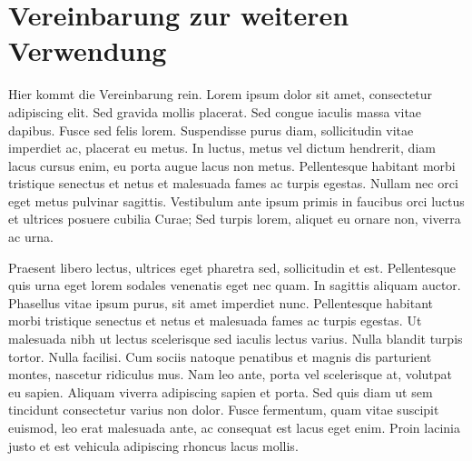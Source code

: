 \chapter*{Vereinbarung zur weiteren Verwendung}

Hier kommt die Vereinbarung rein. Lorem ipsum dolor sit amet, consectetur adipiscing elit. Sed gravida mollis placerat. Sed congue iaculis massa vitae dapibus. Fusce sed felis lorem. Suspendisse purus diam, sollicitudin vitae imperdiet ac, placerat eu metus. In luctus, metus vel dictum hendrerit, diam lacus cursus enim, eu porta augue lacus non metus. Pellentesque habitant morbi tristique senectus et netus et malesuada fames ac turpis egestas. Nullam nec orci eget metus pulvinar sagittis. Vestibulum ante ipsum primis in faucibus orci luctus et ultrices posuere cubilia Curae; Sed turpis lorem, aliquet eu ornare non, viverra ac urna.

Praesent libero lectus, ultrices eget pharetra sed, sollicitudin et est. Pellentesque quis urna eget lorem sodales venenatis eget nec quam. In sagittis aliquam auctor. Phasellus vitae ipsum purus, sit amet imperdiet nunc. Pellentesque habitant morbi tristique senectus et netus et malesuada fames ac turpis egestas. Ut malesuada nibh ut lectus scelerisque sed iaculis lectus varius. Nulla blandit turpis tortor. Nulla facilisi. Cum sociis natoque penatibus et magnis dis parturient montes, nascetur ridiculus mus. Nam leo ante, porta vel scelerisque at, volutpat eu sapien. Aliquam viverra adipiscing sapien et porta. Sed quis diam ut sem tincidunt consectetur varius non dolor. Fusce fermentum, quam vitae suscipit euismod, leo erat malesuada ante, ac consequat est lacus eget enim. Proin lacinia justo et est vehicula adipiscing rhoncus lacus mollis.	